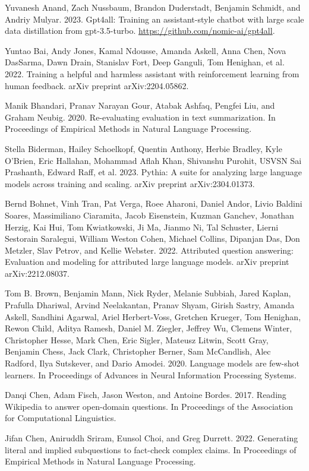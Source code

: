 \documentclass[11pt,UTF8,fontset=fandol]{ctexart}
\begin{document}
Yuvanesh Anand, Zach Nussbaum, Brandon Duderstadt, Benjamin Schmidt, and Andriy Mulyar. 2023. Gpt4all: Training an assistant-style chatbot with large scale data distillation from gpt-3.5-turbo. \url{https://github.com/nomic-ai/gpt4all}.

Yuntao Bai, Andy Jones, Kamal Ndousse, Amanda Askell, Anna Chen, Nova DasSarma, Dawn Drain, Stanislav Fort, Deep Ganguli, Tom Henighan, et al. 2022. Training a helpful and harmless assistant with reinforcement learning from human feedback. arXiv preprint arXiv:2204.05862.

Manik Bhandari, Pranav Narayan Gour, Atabak Ashfaq, Pengfei Liu, and Graham Neubig. 2020. Re-evaluating evaluation in text summarization. In Proceedings of Empirical Methods in Natural Language Processing.

Stella Biderman, Hailey Schoelkopf, Quentin Anthony, Herbie Bradley, Kyle O'Brien, Eric Hallahan, Mohammad Aflah Khan, Shivanshu Purohit, USVSN Sai Prashanth, Edward Raff, et al. 2023. Pythia: A suite for analyzing large language models across training and scaling. arXiv preprint arXiv:2304.01373.

Bernd Bohnet, Vinh Tran, Pat Verga, Roee Aharoni, Daniel Andor, Livio Baldini Soares, Massimiliano Ciaramita, Jacob Eisenstein, Kuzman Ganchev, Jonathan Herzig, Kai Hui, Tom Kwiatkowski, Ji Ma, Jianmo Ni, Tal Schuster, Lierni Sestorain Saralegui, William Weston Cohen, Michael Collins, Dipanjan Das, Don Metzler, Slav Petrov, and Kellie Webster. 2022. Attributed question answering: Evaluation and modeling for attributed large language models. arXiv preprint arXiv:2212.08037.

Tom B. Brown, Benjamin Mann, Nick Ryder, Melanie Subbiah, Jared Kaplan, Prafulla Dhariwal, Arvind Neelakantan, Pranav Shyam, Girish Sastry, Amanda Askell, Sandhini Agarwal, Ariel Herbert-Voss, Gretchen Krueger, Tom Henighan, Rewon Child, Aditya Ramesh, Daniel M. Ziegler, Jeffrey Wu, Clemens Winter, Christopher Hesse, Mark Chen, Eric Sigler, Mateusz Litwin, Scott Gray, Benjamin Chess, Jack Clark, Christopher Berner, Sam McCandlish, Alec Radford, Ilya Sutskever, and Dario Amodei. 2020. Language models are few-shot learners. In Proceedings of Advances in Neural Information Processing Systems.

Danqi Chen, Adam Fisch, Jason Weston, and Antoine Bordes. 2017. Reading Wikipedia to answer open-domain questions. In Proceedings of the Association for Computational Linguistics.

Jifan Chen, Aniruddh Sriram, Eunsol Choi, and Greg Durrett. 2022. Generating literal and implied subquestions to fact-check complex claims. In Proceedings of Empirical Methods in Natural Language Processing.
\end{document}
